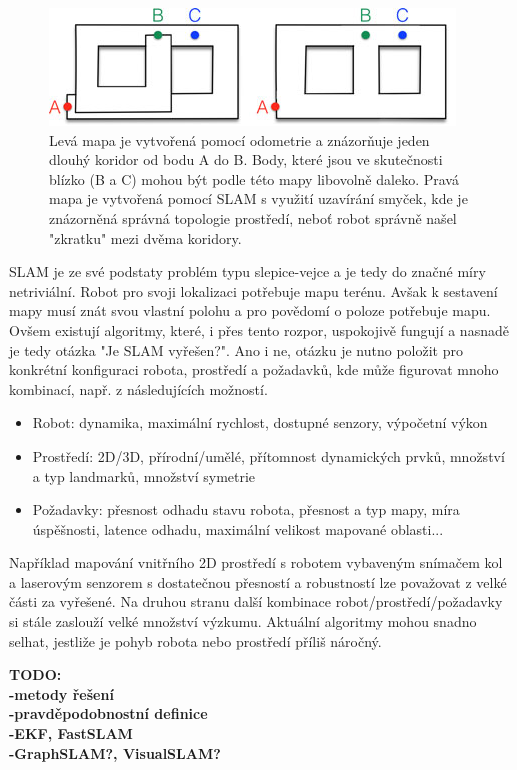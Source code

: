 \documentclass[12pt,a4paper]{article}
\begin{document}
\begin{figure}[H]
\includegraphics[scale=1]{Obr1} 
\caption{Levá mapa je vytvořená pomocí odometrie a znázorňuje jeden dlouhý koridor od bodu A do B. Body, které jsou ve skutečnosti blízko (B a C) mohou být podle této mapy libovolně daleko. Pravá mapa je vytvořená pomocí SLAM s využití uzavírání smyček, kde je znázorněná správná topologie prostředí, neboť robot správně našel "zkratku" mezi dvěma koridory.}
\end{figure}


\newpage
SLAM je ze své podstaty problém typu slepice-vejce a je tedy do značné míry netriviální. Robot pro svoji lokalizaci potřebuje mapu terénu. Avšak k sestavení mapy musí znát svou vlastní polohu a pro povědomí o poloze potřebuje mapu. Ovšem existují algoritmy, které, i přes tento rozpor, uspokojivě fungují a nasnadě je tedy otázka "Je SLAM vyřešen?". Ano i ne, otázku je nutno položit pro konkrétní konfiguraci robota, prostředí a požadavků, kde může figurovat mnoho kombinací, např. z následujících možností.
\begin{itemize}
\item Robot: dynamika, maximální rychlost, dostupné senzory, výpočetní výkon
\item Prostředí: 2D/3D, přírodní/umělé, přítomnost dynamických prvků, množství a typ landmarků, množství symetrie
\item Požadavky: přesnost odhadu stavu robota, přesnost a typ mapy, míra úspěšnosti, latence odhadu, maximální velikost mapované oblasti...
\end{itemize}
Například mapování vnitřního 2D prostředí s robotem vybaveným snímačem kol a laserovým senzorem s dostatečnou přesností a robustností lze považovat z velké části za vyřešené. Na druhou stranu další kombinace robot/prostředí/požadavky si stále zaslouží velké množství výzkumu. Aktuální algoritmy mohou snadno selhat, jestliže je pohyb robota nebo prostředí příliš náročný.


\textbf{TODO: \\
-metody řešení \\
-pravděpodobnostní definice \\
-EKF, FastSLAM \\
-GraphSLAM?, VisualSLAM?} 
\end{document}

